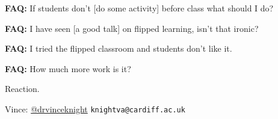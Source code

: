 \documentclass{beamer}
\begin{document}
	\begin{frame}
		\begin{center}
			\Large
			\textbf{FAQ:} If students don't [do some activity] before class what
            should I do?
		\end{center}
	\end{frame}

    \begin{frame}
        \begin{center}
			\Large
            \textbf{FAQ:} I have seen [a good talk] on flipped learning, isn't
            that ironic?
        \end{center}
    \end{frame}

	\begin{frame}
		\begin{center}
			\Large
			\textbf{FAQ:} I tried the flipped classroom and students don't like it.
		\end{center}
	\end{frame}

	\begin{frame}
		\begin{center}
			\Large
			\textbf{FAQ:} How much more work is it?
		\end{center}
	\end{frame}

    \begin{frame}
        \begin{center}
            \Large
            Reaction.
        \end{center}
    \end{frame}

    \begin{frame}
        \begin{center}
            \normalsize
            Vince: \href{https://twitter.com/drvinceknight}{@drvinceknight}
            \texttt{knightva@cardiff.ac.uk}
        \end{center}
    \end{frame}
\end{document}
